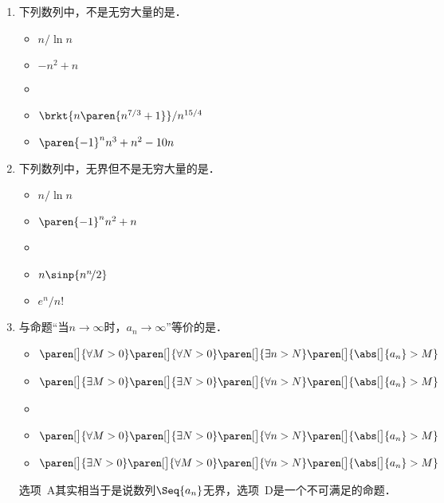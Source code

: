 \begin{enumerate}
\item 下列数列中，不是无穷大量的是\uline{\makebox[8em]{}}．
  \begin{itemize}
    \renewcommand{\labelitemi}{\faCircleThin}
  \item \(n/\!\ln n\)
  \item \(-n^2 + n\)
    \ifshowsol
  \item[\faCircle]
    \else
  \item
    \fi
    \(\brkt{n\paren{n^{7/3}+1}}/n^{15/4}\)
  \item \(\paren{-1}^n n^3 + n^2 - 10n\)
  \end{itemize}

\item 下列数列中，无界但不是无穷大量的是\uline{\makebox[6em]{}}．
  \begin{itemize}
    \renewcommand{\labelitemi}{\faCircleThin}
  \item \(n/\!\ln n\)
  \item \(\paren{-1}^n n^2 + n\)
    \ifshowsol
  \item[\faCircle]
    \else
  \item
    \fi
    \(n \sinp{n^n\!/2}\)
  \item \(e^n\!/n!\)
  \end{itemize}

\item 与命题“当\(n\to\infty\)时，\(a_n\to\infty\)”等价的是\uline{\makebox[10em]{}}．
  \begin{itemize}
    \renewcommand{\labelitemi}{\faCircleThin}
  \item \(
    \paren[\big]{\forall M > 0}
    \paren[\big]{\forall N > 0}
    \paren[\big]{\exists n > N}
    \paren[\big]{\abs[\big]{a_n} > M}
    \)
  \item \(
    \paren[\big]{\exists M > 0}
    \paren[\big]{\exists N > 0}
    \paren[\big]{\forall n > N}
    \paren[\big]{\abs[\big]{a_n} > M}
    \)
    \ifshowsol
  \item[\faCircle]
    \else
  \item
    \fi
    \(
    \paren[\big]{\forall M > 0}
    \paren[\big]{\exists N > 0}
    \paren[\big]{\forall n > N}
    \paren[\big]{\abs[\big]{a_n} > M}
    \)
  \item \(
    \paren[\big]{\exists N > 0}
    \paren[\big]{\forall M > 0}
    \paren[\big]{\forall n > N}
    \paren[\big]{\abs[\big]{a_n} > M}
    \)
  \end{itemize}

  \ifshowsol
  选项~A其实相当于是说数列\(\Seq{a_n}\)无界，选项~D是一个不可满足的命题．
  \fi


\end{enumerate}
